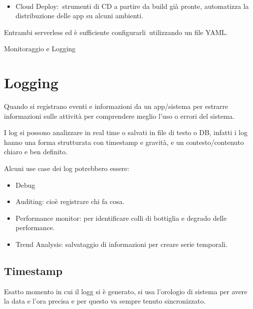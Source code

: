 \documentclass[
]{article}
\providecommand{\tightlist}{%
  \setlength{\itemsep}{0pt}\setlength{\parskip}{0pt}}
\begin{document}
{~}

\begin{itemize}
\tightlist
\item
  {Cloud Deploy:}{~strumenti di CD a partire da build già pronte,
  automatizza la distribuzione delle app su alcuni ambienti.}
\end{itemize}

{}

{Entrambi serverless ed è sufficiente }{configurarli}{~utilizzando un
file YAML.}

{}

{Monitoraggio e Logging}

\section{\texorpdfstring{{Logging}}{Logging}}\label{h.7rv8zgf87wux}

{Quando si registrano eventi e informazioni da un app/sistema per
estrarre informazioni sulle attività per comprendere meglio l'uso o
errori del sistema.}

{}

{I log si possono analizzare in real time o salvati in file di testo o
DB, infatti i log hanno una forma strutturata con timestamp e gravità, e
un contesto/contenuto chiaro e ben definito.}

{}

{Alcuni use case dei log potrebbero essere:}

\begin{itemize}
\tightlist
\item
  {Debug}
\item
  {Auditing}{: cioè registrare chi fa cosa.}
\item
  {Performance monitor}{: per identificare colli di bottiglia e degrado
  delle performance.}
\item
  {Trend Analysis}{: salvataggio di informazioni per creare serie
  temporali.}
\end{itemize}

{}

\subsection{\texorpdfstring{{Timestamp}}{Timestamp}}\label{h.xtvhfrd9fkma}

{Esatto momento in cui il logg si è generato, si usa l'orologio di
sistema per avere la data e l'ora precisa e per questo va sempre tenuto
sincronizzato.}
\end{document}
